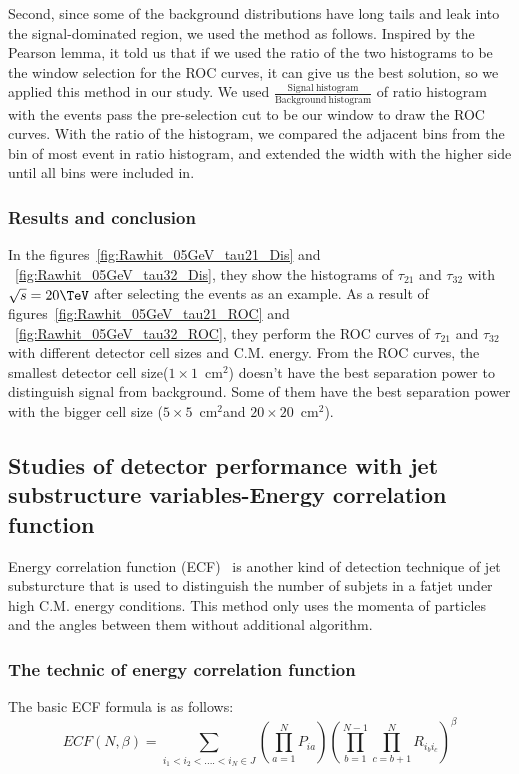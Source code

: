 \documentclass[12pt,twoside,a4paper,an,final]{cms-tdr}
\begin{document}
Second, since some of the background distributions have long tails and leak into the signal-dominated region, we used the method as follows. Inspired by the Pearson lemma, it told us that if we used the ratio of the two histograms to be the window selection for the ROC curves,  it can give us the best solution, so we applied this method in our study. We used $\frac{\mathrm{Signal \ histogram}}{\mathrm{Background \ histogram}}$ of ratio histogram with the events pass the pre-selection cut to be our window to draw the ROC curves. With the ratio of the histogram, we compared the adjacent bins from the bin of most event in ratio histogram, and extended the width with the higher side until all bins were included in.\\
\subsubsection{Results and conclusion}\label{2}
In the figures~\ref{fig:Rawhit_05GeV_tau21_Dis} and ~\ref{fig:Rawhit_05GeV_tau32_Dis}, they show the histograms of $\tau_{21}$ and $\tau_{32}$ with $\sqrt{s} = 20\TeV$ after selecting the events as an example. As a result of figures~\ref{fig:Rawhit_05GeV_tau21_ROC} and ~\ref{fig:Rawhit_05GeV_tau32_ROC}, they perform the ROC curves of $\tau_{21}$ and $\tau_{32}$ with different detector cell sizes and C.M. energy. From the ROC curves, the smallest detector cell size($1 \times 1$~$\mathrm{cm}^2$) doesn't have the best separation power to distinguish signal from background. Some of them have the best separation power with the bigger cell size ($5 \times 5$~$\mathrm{cm}^2$and $20 \times 20$~$\mathrm{cm}^2$).\\

\subsection{Studies of detector performance with jet substructure variables-Energy correlation function}
Energy correlation function (ECF)~\cite{Larkoski:2013eya} is another kind of detection technique of jet substurcture that is used to distinguish the number of subjets in a fatjet under high C.M. energy conditions. This method only uses the momenta of particles and the angles between them without additional algorithm.\\
\subsubsection{The technic of energy correlation function}
The basic ECF formula is as follows:\\
\begin{equation} \label{eq:ECF_Original}
ECF(N,\beta)=\sum_{i_{1}<i_{2}<....<i_{N}\in J} (\prod_{a=1}^{N}P_{ia})(\prod_{b=1}^{N-1}\prod_{c=b+1}^{N} R_{i_{b}i_{c}})^{\beta}
\end{equation}
\end{document}
